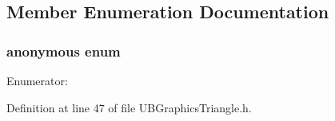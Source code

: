 \subsection{Member Enumeration Documentation}
\hypertarget{class_u_b_graphics_triangle_a238311e6de7d7a1ee5227f123dc0eced}{\subsubsection[{anonymous enum}]{\setlength{\rightskip}{0pt plus 5cm}anonymous enum}}\label{da/dd0/class_u_b_graphics_triangle_a238311e6de7d7a1ee5227f123dc0eced}
\begin{Desc}
\item[Enumerator\-: ]\par
\begin{description}
\item[{\em 
\hypertarget{class_u_b_graphics_triangle_a238311e6de7d7a1ee5227f123dc0eceda516a2724cf06dfe805262241ccc4eca5}{Type}\label{da/dd0/class_u_b_graphics_triangle_a238311e6de7d7a1ee5227f123dc0eceda516a2724cf06dfe805262241ccc4eca5}
}]\end{description}
\end{Desc}



Definition at line 47 of file U\-B\-Graphics\-Triangle.\-h.

